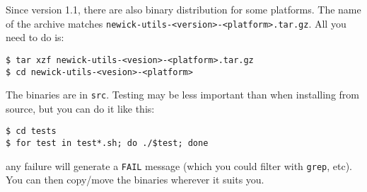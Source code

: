 Since version 1.1, there are also binary distribution for some platforms. The
name of the archive matches \texttt{newick-utils-<version>-<platform>.tar.gz}.
All you need to do is:

\begin{verbatim}
$ tar xzf newick-utils-<vesion>-<platform>.tar.gz
$ cd newick-utils-<vesion>-<platform>
\end{verbatim}

\noindent{}The binaries are in \texttt{src}. Testing may be less important than
when installing from source, but you can do it like this:

\begin{verbatim}
$ cd tests
$ for test in test*.sh; do ./$test; done 
\end{verbatim}

\noindent{}any failure will generate a \texttt{FAIL} message (which you could filter with \texttt{grep}, etc).  You can then copy/move the binaries wherever it suits you.

